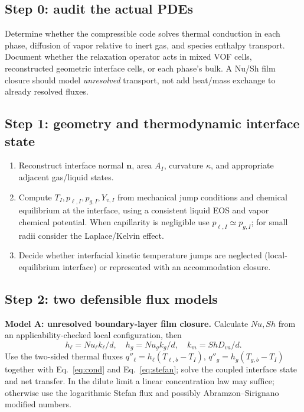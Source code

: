 \documentclass[11pt,letterpaper]{article}
\begin{document}
\subsection{Step 0: audit the actual PDEs}
Determine whether the compressible code solves thermal conduction in each phase, diffusion of vapor relative to inert gas, and species enthalpy transport. Document whether the relaxation operator acts in mixed VOF cells, reconstructed geometric interface cells, or each phase's bulk. A Nu/Sh film closure should model \emph{unresolved} transport, not add heat/mass exchange to already resolved fluxes.

\subsection{Step 1: geometry and thermodynamic interface state}
\begin{enumerate}
\item Reconstruct interface normal $\bm n$, area $A_I$, curvature $\kappa$, and appropriate adjacent gas/liquid states.
\item Compute $T_I,p_{\ell,I},p_{g,I},Y_{v,I}$ from mechanical jump conditions and chemical equilibrium at the interface, using a consistent liquid EOS and vapor chemical potential. When capillarity is negligible use $p_{\ell,I}\simeq p_{g,I}$; for small radii consider the Laplace/Kelvin effect.
\item Decide whether interfacial kinetic temperature jumps are neglected (local-equilibrium interface) or represented with an accommodation closure.
\end{enumerate}

\subsection{Step 2: two defensible flux models}
\textbf{Model A: unresolved boundary-layer film closure.} Calculate $Nu,Sh$ from an applicability-checked local configuration, then
\begin{equation}
h_\ell=Nu_\ell k_\ell/d,\quad h_g=Nu_gk_g/d,\quad
k_m=Sh D_{va}/d.
\end{equation}
Use the two-sided thermal fluxes $q''_\ell=h_\ell(T_{\ell,b}-T_I)$, $q''_g=h_g(T_{g,b}-T_I)$ together with Eq.~\eqref{eq:cond} and Eq.~\eqref{eq:stefan}; solve the coupled interface state and net transfer. In the dilute limit a linear concentration law may suffice; otherwise use the logarithmic Stefan flux and possibly Abramzon--Sirignano modified numbers.
\end{document}
